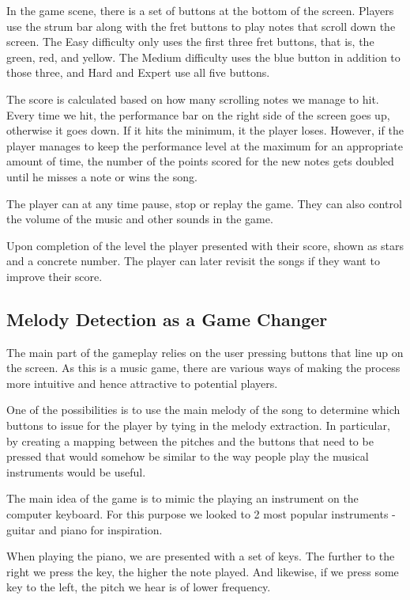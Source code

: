 In the game scene, there is a set of buttons at the bottom of the screen. Players use the strum bar along with the fret buttons to play notes that scroll down the screen. The Easy difficulty only uses the first three fret buttons, that is, the green, red, and yellow. The Medium difficulty uses the blue button in addition to those three, and Hard and Expert use all five buttons.

The score is calculated based on how many scrolling notes we manage to hit. Every time we hit, the performance bar on the right side of the screen goes up, otherwise it goes down. If it hits the minimum, it the player loses. However, if the player manages to keep the performance level at the maximum for an appropriate amount of time, the number of the points scored for the new notes gets doubled until he misses a note or wins the song.

The player can at any time pause, stop or replay the game. They can also control the volume of the music and other sounds in the game. 

Upon completion of the level the player presented with their score, shown as stars and a concrete number. The player can later revisit the songs if they want to improve their score. 

\vspace{10pt}

\subsection{Melody Detection as a Game Changer}

The main part of the gameplay relies on the user pressing buttons that line up on the screen. As this is a music game, there are various ways of making the process more intuitive and hence attractive to potential players. 

One of the possibilities is to use the main melody of the song to determine which buttons to issue for the player by tying in the melody extraction. In particular, by creating a mapping between the pitches and the buttons that need to be pressed that would somehow be similar to the way people play the musical instruments would be useful.

The main idea of the game is to mimic the playing an instrument on the computer keyboard. For this purpose we looked to 2 most popular instruments - guitar and piano for inspiration. 


When playing the piano, we are presented with a set of keys. The further to the right we press the key, the higher the note played. And likewise, if we press some key to the left, the pitch we hear is of lower frequency. 

